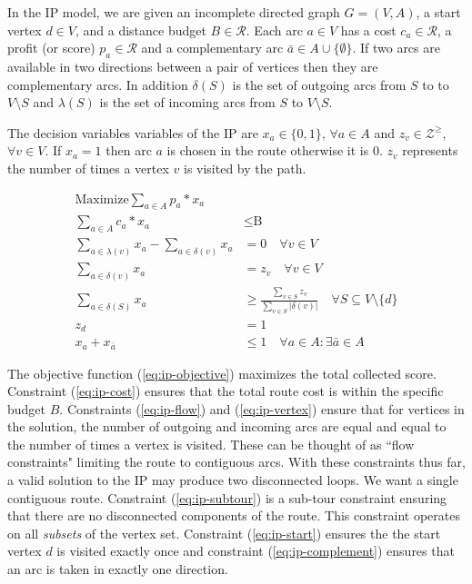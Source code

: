 \documentclass[11pt]{article}
\newcommand{\RR}{\mathcal{R}} %
\newcommand{\ZZ}{\mathcal{Z}} %
\newcommand{\set}[1]{\ensuremath{\{{#1}\}}} %
\newcommand{\sse}{\subseteq} %
\begin{document}
In the IP model, we are given an incomplete directed graph $G = (V,A)$, a start vertex $d \in V$, and a distance budget $B \in \RR$. Each arc $a \in V$ has a cost $c_a \in \RR$, a profit (or score) $p_a \in \RR$ and a complementary arc $\bar{a} \in A \cup \set{\emptyset}$. If two arcs are available in two directions between a pair of vertices then they are complementary arcs. In addition $\delta(S)$ is the set of outgoing arcs from $S$ to to $V \setminus S$ and $\lambda(S)$ is the set of incoming arcs from $S$ to $V \setminus S$.

The decision variables variables of the IP are $x_a \in \set{0,1}$, $\forall a \in A$ and $z_v \in \ZZ^{\geq}$, $\forall v \in V$. If $x_a = 1$ then arc $a$ is chosen in the route otherwise it is 0. $z_v$ represents the number of times a vertex $v$ is visited by the path.

\begin{align}
\text{Maximize} \sum_{a \in A}{p_a * x_a} &\label{eq:ip-objective}\\  
\sum_{a \in A}{c_a * x_a} &\leq \text{B} \label{eq:ip-cost}\\
\sum_{a \in \lambda(v)}{x_a}  -\sum_{a \in \delta(v)}{x_a} &= 0 \quad \forall v \in V\label{eq:ip-flow}\\
\sum_{a \in \delta(v)}{x_a} &= z_v \quad\forall v \in V \label{eq:ip-vertex}\\
\sum_{a \in \delta(S)}{x_a} &\geq \frac{\sum_{v \in S}{z_v}}{\sum_{v \in S}{|\delta(v)|}} \quad \forall S \sse V \setminus \set{d} \label{eq:ip-subtour}\\
z_d &= 1\label{eq:ip-start}\\
x_a + x_{\bar{a}} &\leq 1 \quad \forall a \in A: \exists\bar{a} \in A\label{eq:ip-complement}
\end{align}

The objective function (\ref{eq:ip-objective}) maximizes the total collected score. Constraint (\ref{eq:ip-cost}) ensures that the total route cost is within the specific budget $B$. Constraints (\ref{eq:ip-flow}) and (\ref{eq:ip-vertex}) ensure that for vertices in the solution, the number of outgoing and incoming arcs are equal and equal to the number of times a vertex is visited. These can be thought of as ``flow constraints" limiting the route to contiguous arcs. With these constraints thus far, a valid solution to the IP may produce two disconnected loops. We want a single contiguous route. Constraint (\ref{eq:ip-subtour}) is a sub-tour constraint ensuring that there are no disconnected components of the route. This constraint operates on all \emph{subsets} of the vertex set. Constraint (\ref{eq:ip-start}) ensures the the start vertex $d$ is visited exactly once and constraint (\ref{eq:ip-complement}) ensures that an arc is taken in exactly one direction.
 
\end{document}
